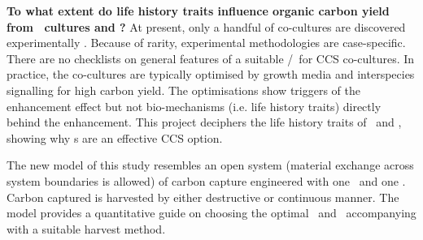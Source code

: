\documentclass[env.tex]{subfiles}
\begin{document}
\textbf{To what extent do life history traits influence organic carbon yield from \phy\ cultures and \pbs?}  At present, only a handful of co-cultures are discovered experimentally \autocite{fuentes2016impact,santos2014microalgal}.  Because of rarity, experimental methodologies are case-specific.  There are no checklists on general features of a suitable \phy/\bacm\ for CCS co-cultures.  In practice, the co-cultures are typically optimised by growth media \autocite{aytekin2016statistical,fuentes2016impact} and interspecies signalling \autocite{fuentes2016impact} for high carbon yield.  The optimisations show triggers of the enhancement effect but not bio-mechanisms (i.e. life history traits) directly behind the enhancement.  This project deciphers the life history traits of \phy\ and \bac, showing why \pbs s are an effective CCS option.

The new model of this study resembles an open system (material exchange across system boundaries is allowed) of carbon capture engineered with one \phy\ and one \bacm.  Carbon captured is harvested by either destructive or continuous manner.  The model provides a quantitative guide on choosing the optimal \phy\ and \bac\ accompanying with a suitable harvest method.
\end{document}
